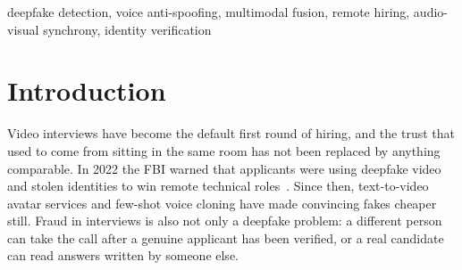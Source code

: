 \documentclass[conference]{IEEEtran}
\begin{document}
\begin{abstract}
Remote hiring now has to deal with candidates who are not who they claim to be: synthetic talking heads, cloned
voices, stand-in proxies, and applicants reading prepared answers off a second screen. Detectors built for one of
these problems are usually evaluated on studio-quality benchmarks that look little like a webcam interview. We
present TrustHire, a system that watches a live interview over WebRTC, cuts it into 3\,s windows with 50\%
overlap, and scores each window with ten evidence modules covering face forgery, voice spoofing, lip
synchrony, face and voice identity continuity, gaze behaviour, remote photoplethysmography, scene objects,
answer delivery, and consistency with the resume. A calibrated fusion stage turns these into a per-window risk
timeline and a session trust score, and every alert is backed by a visual or acoustic explanation. On public
data, the selected voice-spoofing model reaches \ITWSpectraEER\% equal error rate (EER) on In-the-Wild against
\ITWAasistEER\% for the commonly used AASIST baseline, while degrading sharply in reverberant rooms. On a pilot
set of \NSess{} interview recordings collected by the authors, replacing a FaceForensics++-trained detector with
a general AI-image detector and learning the fusion weights raises session-level AUC from \HandOldSessAUC{} to
\LearnSessAUC{}~$\pm$~\LearnSessAUCsd{}. The full pipeline runs at \LatMedian\,s per window on a laptop CPU, faster
than the 1.5\,s hop. We report where the system fails, most notably on scripted reading.
\end{abstract}

\begin{IEEEkeywords}
deepfake detection, voice anti-spoofing, multimodal fusion, remote hiring, audio-visual synchrony, identity verification
\end{IEEEkeywords}

\section{Introduction}

Video interviews have become the default first round of hiring, and the trust that used to come from sitting in
the same room has not been replaced by anything comparable. In 2022 the FBI warned that applicants were using
deepfake video and stolen identities to win remote technical roles~\cite{fbi2022}. Since then, text-to-video
avatar services and few-shot voice cloning have made convincing fakes cheaper still. Fraud in interviews is
also not only a deepfake problem: a different person can take the call after a genuine applicant has been
verified, or a real candidate can read answers written by someone else.
\end{document}
